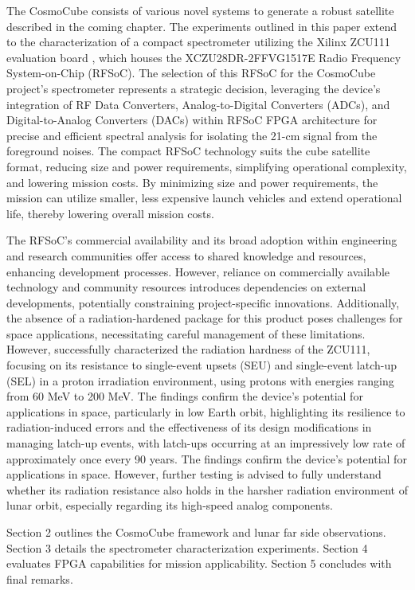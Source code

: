 \documentclass[fleqn,usenatbib]{rasti}
\begin{document}
The CosmoCube consists of various novel systems to generate a robust satellite described in the coming chapter. The experiments outlined in this paper extend to the characterization of a compact spectrometer utilizing the Xilinx ZCU111 evaluation board \citep{ZynqRFSoC2023}, which houses the XCZU28DR-2FFVG1517E Radio Frequency System-on-Chip (RFSoC). The selection of this RFSoC for the CosmoCube project's spectrometer represents a strategic decision, leveraging the device's integration of RF Data Converters, Analog-to-Digital Converters (ADCs), and Digital-to-Analog Converters (DACs) within RFSoC FPGA architecture for precise and efficient spectral analysis for isolating the 21-cm signal from the foreground noises. The compact RFSoC technology suits the cube satellite format, reducing size and power requirements, simplifying operational complexity, and lowering mission costs. By minimizing size and power requirements, the mission can utilize smaller, less expensive launch vehicles and extend operational life, thereby lowering overall mission costs. 

The RFSoC's commercial availability and its broad adoption within engineering and research communities offer access to shared knowledge and resources, enhancing development processes. However, reliance on commercially available technology and community resources introduces dependencies on external developments, potentially constraining project-specific innovations. Additionally, the absence of a radiation-hardened package for this product poses challenges for space applications, necessitating careful management of these limitations. However, \cite{Davis2019} successfully characterized the radiation hardness of the ZCU111, focusing on its resistance to single-event upsets (SEU) and single-event latch-up (SEL) in a proton irradiation environment, using protons with energies ranging from 60 MeV to 200 MeV. The findings confirm the device's potential for applications in space, particularly in low Earth orbit, highlighting its resilience to radiation-induced errors and the effectiveness of its design modifications in managing latch-up events, with latch-ups occurring at an impressively low rate of approximately once every 90 years. The findings confirm the device's potential for applications in space. However, further testing is advised to fully understand whether its radiation resistance also holds in the harsher radiation environment of lunar orbit, especially regarding its high-speed analog components.

Section 2 outlines the CosmoCube framework and lunar far side observations. Section 3 details the spectrometer characterization experiments. Section 4 evaluates FPGA capabilities for mission applicability. Section 5 concludes with final remarks.
\end{document}
